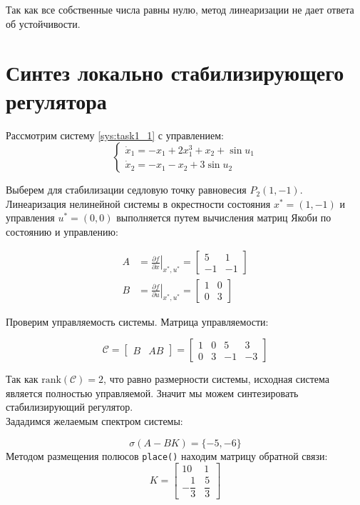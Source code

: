 \documentclass[a4paper,12pt]{article}
\begin{document}
Так как все собственные числа равны нулю, метод линеаризации не дает ответа об устойчивости. 


\newpage
\section{Синтез локально стабилизирующего регулятора}


Рассмотрим систему \eqref{sys:task1_1} с управлением:
\[
\begin{cases}
	\dot{x}_1 = -x_1 + 2x_1^3 + x_2 + \sin u_1 \\
	\dot{x}_2 = -x_1 - x_2 + 3\sin u_2
\end{cases}
\]

Выберем для стабилизации седловую точку равновесия $P_2(1, -1)$. Линеаризация нелинейной системы в окрестности состояния $x^* = (1, -1)$ и управления $u^* = (0, 0)$ выполняется путем вычисления матриц Якоби по состоянию и управлению:

\[
\begin{aligned}
	A &= \left. \frac{\partial f}{\partial x} \right|_{x^*, u^*} = \begin{bmatrix} 5 & 1 \\ -1 & -1 \end{bmatrix} \\[10pt]
	B &= \left. \frac{\partial f}{\partial u} \right|_{x^*, u^*} = \begin{bmatrix} 1 & 0 \\ 0 & 3 \end{bmatrix}
\end{aligned}
\]

Проверим управляемость системы. Матрица управляемости:

\[
\mathcal{C} = \begin{bmatrix} B & AB \end{bmatrix} = 
\begin{bmatrix}
	1 & 0 & 5 & 3 \\
	0 & 3 & -1 & -3
\end{bmatrix}
\]

Так как $\text{rank}(\mathcal{C}) = 2$, что равно размерности системы, исходная система является полностью управляемой. Значит мы можем синтезировать стабилизирующий регулятор.\\

Зададимся желаемым спектром системы:

\[
\sigma(A-BK) = \{-5,-6\}
\]
Методом размещения полюсов \texttt{place()} находим матрицу обратной связи:
\[
K = \begin{bmatrix} 10 & 1 \\[4pt]
	-\dfrac{1}{3} & \dfrac{5}{3} \end{bmatrix}
\]
\end{document}
